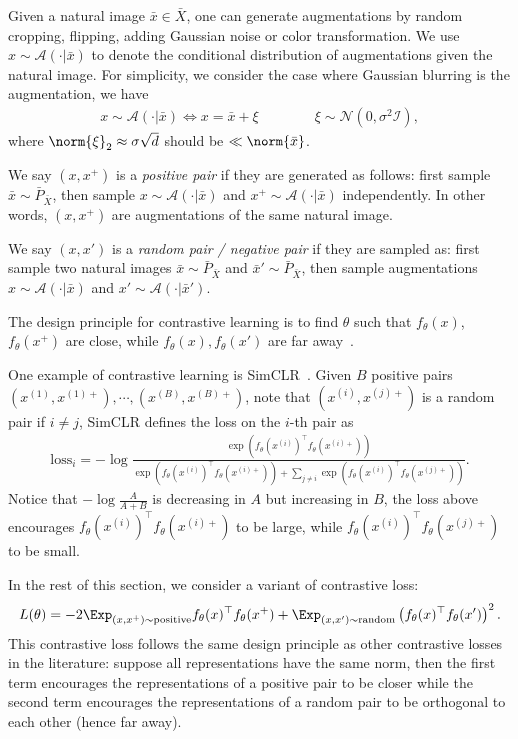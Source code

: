 \newcommand{\aug}[1]{\mathcal{A}(\cdot|#1)}

Given a natural image $\bar{x}\in\bar{X}$, one can generate augmentations by random cropping, flipping, adding Gaussian noise or color transformation. We use $x\sim\aug{\bar{x}}$ to denote the conditional distribution of augmentations given the natural image. For simplicity, we consider the case where Gaussian blurring is the augmentation, we have
\begin{align}
	x\sim\aug{\bar{x}} \Leftrightarrow x=\bar{x}+\xi \quad\quad\quad\quad \xi\sim\mathcal{N}(0, \sigma^2\mathcal{I}),
\end{align}
where $\norm{\xi}_2\approx\sigma\sqrt{d}$ should be $\ll\norm{\bar{x}}$. 

We say $(x, x^+)$ is a \emph{positive pair} if they are generated as follows: first sample $\bar{x}\sim \bar{P}_{\bar{X}}$, then sample $x\sim\aug{\bar{x}}$ and $x^+\sim\aug{\bar{x}}$ independently. In other words, $(x, x^+)$ are augmentations of the same natural image.

We say $(x, x')$ is a \emph{random pair / negative pair} if they are sampled as: first sample two natural images $\bar{x}\sim \bar{P}_{\bar{X}}$ and $\bar{x}'\sim \bar{P}_{\bar{X}}$, then sample augmentations $x\sim\aug{\bar{x}}$ and $x'\sim\aug{\bar{x}'}$.

The design principle for contrastive learning is to find $\theta$ such that $f_{\theta}(x)$, $f_{\theta}(x^+)$ are close, while $f_{{\theta}}(x), f_{{\theta}}(x')$ are far away~\citep{chen2020simclr, zbontar2021barlow, he2020momentum}. 

One example of contrastive learning is SimCLR~\citep{chen2020simclr}.  Given $B$ positive pairs $(x^{(1)}, x^{(1)+}), \cdots, (x^{(B)}, x^{(B)+})$, note that $(x^{(i)}, x^{(j)+})$ is a random pair if $i\ne j$, SimCLR defines the loss on the $i$-th pair as 
\begin{align}
	\text{loss}_i = -\log\frac{\exp(f_{{\theta}}(x^{(i)})^\top f_{{\theta}}(x^{(i)+}))}{\exp(f_{{\theta}}(x^{(i)})^\top f_{{\theta}}(x^{(i)+}))+ \sum_{j\ne i} \exp(f_{{\theta}}(x^{(i)})^\top f_{{\theta}}(x^{(j)+}))}.
\end{align}
Notice that $-\log\frac{A}{A+B}$ is decreasing in $A$ but increasing in $B$, the loss above encourages $f_{{\theta}}(x^{(i)})^\top f_{{\theta}}(x^{(i)+})$ to be large, while $f_{{\theta}}(x^{(i)})^\top f_{{\theta}}(x^{(j)+})$ to be small.

In the rest of this section, we consider a variant of contrastive loss: 
\begin{align}
	L(\theta)  = -2\Exp_{(x, x^+) \sim\text{positive}} f_{{\theta}}(x)^\top f_{{\theta}}(x^+) + \Exp_{(x, x') \sim\text{random}}  \left(f_{{\theta}}(x)^\top f_{{\theta}}(x')\right)^2.
\end{align}
This contrastive loss follows the same design principle as other contrastive losses in the literature: suppose all representations have the same norm, then the first term encourages the representations of a positive pair to be closer while  the second term encourages the representations of a random pair to be orthogonal to each other (hence far away). 


